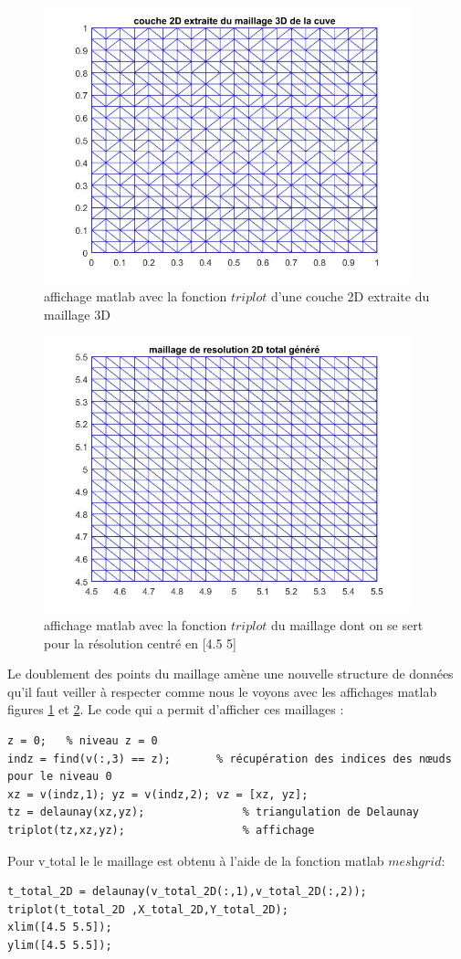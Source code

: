 \documentclass[a4paper,12pt,titlepage]{report}
\begin{document}
\begin{onehalfspace}
\begin{figure}[!h]
	\center
	\includegraphics[height = 8cm, keepaspectratio]{graphes/affichage_extraction_2D.jpg}
	\caption{affichage matlab avec la fonction $triplot$ d'une couche 2D extraite du maillage 3D}
	\label{figure aze}
\end{figure}
\begin{figure}[!h]
	\center
	\includegraphics[height = 8cm, keepaspectratio]{graphes/affichage_extraction_2D_normal.jpg}
	\caption{affichage matlab avec la fonction $triplot$ du maillage dont on se sert pour la résolution centré en [4.5 5]}
	\label{figure 3jj}
\end{figure}
\newpage
Le doublement des points du maillage amène une nouvelle structure de données qu'il faut veiller à respecter comme nous le voyons avec les affichages matlab figures \ref{figure aze} et \ref{figure 3jj}.
Le code qui a permit d'afficher ces maillages :
\begin{verbatim}
z = 0;   % niveau z = 0
indz = find(v(:,3) == z);		% récupération des indices des nœuds pour le niveau 0
xz = v(indz,1); yz = v(indz,2); vz = [xz, yz];
tz = delaunay(xz,yz);               % triangulation de Delaunay 
triplot(tz,xz,yz);   				% affichage
\end{verbatim}
Pour v$\_$total le le maillage est obtenu à l'aide de la fonction matlab $\textit{meshgrid}$:
\begin{verbatim}
t_total_2D = delaunay(v_total_2D(:,1),v_total_2D(:,2)); 
triplot(t_total_2D ,X_total_2D,Y_total_2D);
xlim([4.5 5.5]);
ylim([4.5 5.5]);
\end{verbatim} 


\end{onehalfspace}
\end{document}
